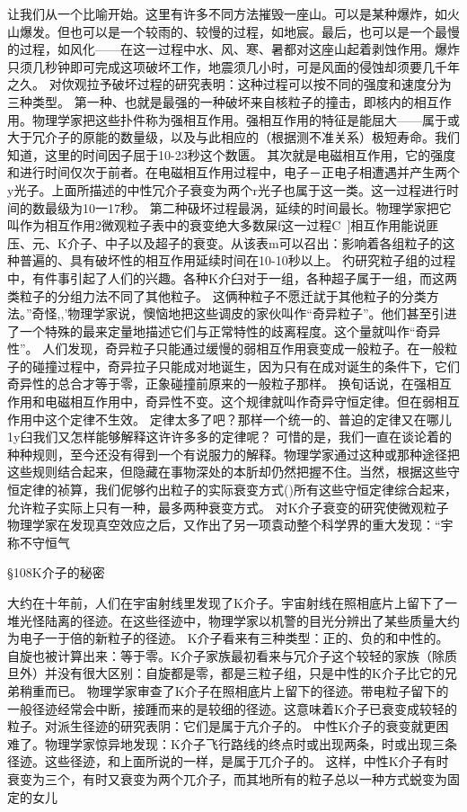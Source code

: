 让我们从一个比喻开始。这里有许多不同方法摧毁一座山。可以是某种爆炸，如火山爆发。但也可以是一个较雨的、较慢的过程，如地宸。最后，也可以是一个最慢的过程，如风化——在这一过程中水、风、寒、暑都对这座山起着剥蚀作用。爆炸只须几秒钟即可完成这项破坏工作，地震须几小时，可是风面的侵蚀却须要几千年之久。
对佽观拉予破坏过程的研究表明：这种过程可以按不同的强度和速度分为三种类型。
第一种、也就是最强的一种破坏来自核粒子的撞击，即核内的相互作用。物理学家把这些扑件称为强相互作用。强相互作用的特征是能屈大——属于或大于冗介子的原能的数量级，以及与此相应的（根据测不准关系）极短寿命。我们知道，这里的时间因子屈于10-23秒这个数匮。
其次就是电磁相互作用，它的强度和进行时间仅次于前者。在电磁相互作用过程中，电子－正电子相遭遇并产生两个y光子。上面所描述的中性冗介子衰变为两个r光子也属于这一类。这一过程进行时间的数最级为10一17秒。
第二种砐坏过程最涡，延续的时间最长。物理学家把它叫作为相互作用2微观粒子表中的衰变绝大多数屎f这一过程C~]相互作用能说匪压、元、K介子、中子以及超子的衰变。从该表m可以召出：影响着各组粒子的这种普遍的、具有破坏性的相互作用延续时间在10-10秒以上。
彴研究粒子组的过程中，有件事引起了人们的兴趣。各种K介臼对于一组，各种超子属于一组，而这两类粒子的分组力法不同了其他粒子。
这俩种粒子不愿迁訧于其他粒子的分类方法。”奇怪,,'物理学家说，懊恼地把这些调皮的家伙叫作“奇异粒子”。他们甚至引进了一个特殊的最来定量地描述它们与正常特性的歧离程度。这个量就叫作“奇异性”。
人们发现，奇异粒子只能通过缓慢的弱相互作用衰变成一般粒子。在一般粒子的碰撞过程中，奇异拉子只能成对地诞生，因为只有在成对诞生的条件下，它们奇异性的总合才等于零，正象碰撞前原来的一般粒子那样。
换旬话说，在强相互作用和电磁相互作用中，奇异性不变。这个规律就叫作奇异守恒定律。但在弱相互作用中这个定律不生效。
定律太多了吧？那样一个统一的、普迫的定律又在哪儿1y臼我们又怎样能够解释这许许多多的定律呢？
可惜的是，我们一直在谈论着的种种规则，至今还没有得到一个有说服力的解释。物理学家通过这种或那种途径把这些规则结合起来，但隐藏在事物深处的本肵却仍然把握不住。当然，根据这些守恒定律的祯算，我们伲够彴出粒子的实际衰变方式()所有这些守恒定律综合起来，允许粒子实际上只有一种，最多两种衰变方式。
对K介子衰变的研究使微观粒子物理学家在发现真空效应之后，又作出了另一项袁动整个科学界的重大发现：“宇称不守恒气

§108K介子的秘密

大约在十年前，人们在宇宙射线里发现了K介子。宇宙射线在照相底片上留下了一堆光怪陆离的径迹。在这些径迹中，物理学家以机警的目光分辨出了某些质量大约为电子一于倍的新粒子的径迹。
K介子看来有三种类型：正的、负的和中性的。自旋也被计算出来：等于零。K介子家族最初看来与冗介子这个较轻的家族（除质旦外）并没有很大区别：自旋都是零，都是三粒子组，只是中性的K介子比它的兄弟稍重而已。
物理学家审查了K介子在照相底片上留下的径迹。带电粒子留下的一般径迹经常会中断，接踵而来的是较细的径迹。这意味着K介子已衰变成较轻的粒子。对派生径迹的研究表阴：它们是属于亢介子的。
中性K介子的衰变就更困难了。物理学家惊异地发现：K介子飞行路线的终点时或出现两条，时或出现三条径迹。这些径迹，和上面所说的一样，是属于兀介子的。
这样，中性K介子有时衰变为三个，有时又衰变为两个兀介子，而其地所有的粒子总以一种方式蜕变为固定的女儿

